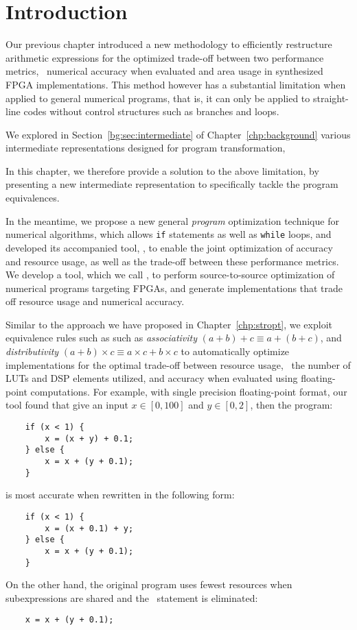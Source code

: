 \section{Introduction}
\label{po:sec:introduction}

Our previous chapter introduced a new methodology to efficiently restructure
arithmetic expressions for the optimized trade-off between two performance
metrics, \ie~numerical accuracy when evaluated and area usage in synthesized
FPGA implementations.  This method however has a substantial limitation when
applied to general numerical programs, that is, it can only be applied to
straight-line codes without control structures such as branches and loops.

We explored in Section~\ref{bg:sec:intermediate} of
Chapter~\ref{chp:background} various intermediate representations designed for
program transformation, 

In this chapter, we therefore provide a solution to the above limitation, by
presenting a new intermediate representation to specifically tackle the program
equivalences.

In the meantime, we propose a new general \emph{program} optimization technique
for numerical algorithms, which allows \texttt{if} statements as well as
\texttt{while} loops, and developed its accompanied tool, \newsoap, to enable
the joint optimization of accuracy and resource usage, as well as the trade-off
between these performance metrics.  We develop a tool, which we call \newsoap,
to perform source-to-source optimization of numerical programs targeting FPGAs,
and generate implementations that trade off resource usage and numerical
accuracy.


Similar to the approach we have proposed in Chapter~\ref{chp:stropt}, we
exploit equivalence rules such as such as \emph{associativity} $(a + b) +
c \equiv a + (b + c)$, and \emph{distributivity} $(a + b) \times c \equiv
a \times c + b \times c$ to automatically optimize implementations for
the optimal trade-off between resource usage, \ie~the number of LUTs and
DSP elements utilized, and accuracy when evaluated using floating-point
computations.  For example, with single precision floating-point format, our
tool found that give an input $x \in [0, 100]$ and $y \in [0, 2]$, then the
program:
\begin{lstlisting}
    if (x < 1) {
        x = (x + y) + 0.1;
    } else {
        x = x + (y + 0.1);
    }
\end{lstlisting}
is most accurate when rewritten in the following form:
\begin{lstlisting}
    if (x < 1) {
        x = (x + 0.1) + y;
    } else {
        x = x + (y + 0.1);
    }
\end{lstlisting}
On the other hand, the original program uses fewest resources when
subexpressions are shared and the \iflit~statement is eliminated:
\begin{lstlisting}
    x = x + (y + 0.1);
\end{lstlisting}

